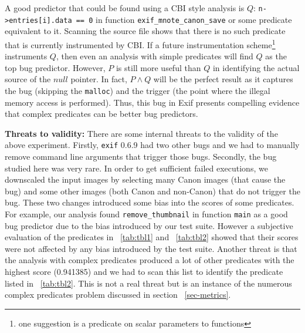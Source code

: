 A good predictor that could be found using a CBI style analysis is $Q$: \texttt{n->entries[i].data == 0} in function \texttt{exif\_\-mnote\_\-canon\_save} or some predicate equivalent to it.  Scanning the source file shows that there is no such predicate that is currently instrumented by CBI.  If a future instrumentation scheme{\footnote{one suggestion is a predicate on scalar parameters to functions}} instruments $Q$, then even an analysis with simple predicates will find $Q$ as the top bug predictor.  However, $P$ is still more useful than $Q$ in identifying the actual source of the $null$ pointer.  In fact, $P \wedge Q$ will be the perfect result as it captures the bug (skipping the \texttt{malloc}) and the trigger (the point where the illegal memory access is performed).  Thus, this bug in Exif presents compelling evidence that complex predicates can be better bug predictors.

\vspace{4pt} \noindent
{\bf Threats to validity:}  There are some internal threats to the validity of the above experiment.  Firstly, \texttt{exif} 0.6.9 had two other bugs and we had to manually remove command line arguments that trigger those bugs.  Secondly, the bug studied here was very rare.  In order to get sufficient failed executions, we downscaled the input images by selecting many Canon images (that cause the bug) and some other images (both Canon and non-Canon) that do not trigger the bug.  These two changes introduced some bias into the scores of some predicates.  For example, our analysis found \texttt{remove\_thumbnail} in function \texttt{main} as a good bug predictor due to the bias introduced by our test suite.  However a subjective evaluation of the predicates in ~\autoref{tab:tbl1} and ~\autoref{tab:tbl2} showed that their scores were not affected by any bias introduced by the test suite.  Another threat is that the analysis with complex predicates produced a lot of other predicates with the highest score (0.941385) and we had to scan this list to identify the predicate listed in ~\autoref{tab:tbl2}.  This is not a real threat but is an instance of the numerous complex predicates problem discussed in section ~\ref{sec-metrics}.

